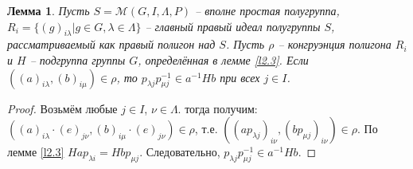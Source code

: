 \documentclass[a4paper]{article}
\newtheorem{lemma}{Лемма}
\begin{document}
	\begin{lemma} \label{l2.4}
		Пусть $S = \mathcal{M}(G,I,\Lambda,P)$ -- вполне простая полугруппа, $R_i = \{ (g)_{i \lambda} | g \in G, \lambda \in \Lambda \}$ -- главный правый идеал полугруппы $S$, рассматриваемый как правый полигон над $S$. Пусть $\rho$ -- конгруэнция полигона $R_i$ и $H$ -- подгруппа группы $G$, определённая в лемме \ref{l2.3}. Если $((a)_{i \lambda},(b)_{i \mu}) \in \rho$, то $p_{\lambda j}p_{\mu j}^{-1} \in a^{-1} H b$ при всех $j \in I$.
	\end{lemma}
	\begin{proof}
		Возьмём любые $j \in I$, $\nu \in \Lambda$. тогда получим: $((a)_{i \lambda} \cdot (e)_{j \nu},(b)_{i \mu} \cdot (e)_{j \nu}) \in \rho$, т.е. $((ap_{\lambda j})_{i \nu},(bp_{\mu j})_{i \nu}) \in \rho$. По лемме \ref{l2.3} $H a p_{\lambda i} = H b p_{\mu j}$. Следовательно, $p_{\lambda j} p_{\mu j}^{-1} \in a^{-1} H b$.
	\end{proof}
	
\end{document}

